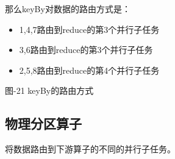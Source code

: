 \begin{Shaded}
\begin{Highlighting}[]
  \OperatorTok{(}\OperatorTok{,}\OperatorTok{,}\OperatorTok{,}\OperatorTok{,}\OperatorTok{,}\OperatorTok{,}\OperatorTok{,}\OperatorTok{)}
  \OperatorTok{(}\OperatorTok{)}
  \OperatorTok{(}\OperatorTok{{-}\textgreater{}}\OperatorTok{\%} \OperatorTok{)}
  \OperatorTok{(}\OperatorTok{\textless{}}\OperatorTok{\textgreater{}()} \OperatorTok{\{}
      \OperatorTok{(}\OperatorTok{,} \OperatorTok{)}   \OperatorTok{\{}
      \OperatorTok{+}\OperatorTok{;}
    \OperatorTok{\}}
  \OperatorTok{\})}
  \OperatorTok{(}\OperatorTok{)}
  \OperatorTok{()}
  \OperatorTok{(}\OperatorTok{);}
\end{Highlighting}
\end{Shaded}

那么keyBy对数据的路由方式是：

\begin{itemize}
\tightlist
\item
  1,4,7路由到reduce的第3个并行子任务
\item
  3,6路由到reduce的第3个并行子任务
\item
  2,5,8路由到reduce的第4个并行子任务
\end{itemize}

图-21 keyBy的路由方式

\hypertarget{ux7269ux7406ux5206ux533aux7b97ux5b50}{%
\subsection{物理分区算子}\label{ux7269ux7406ux5206ux533aux7b97ux5b50}}

将数据路由到下游算子的不同的并行子任务。

